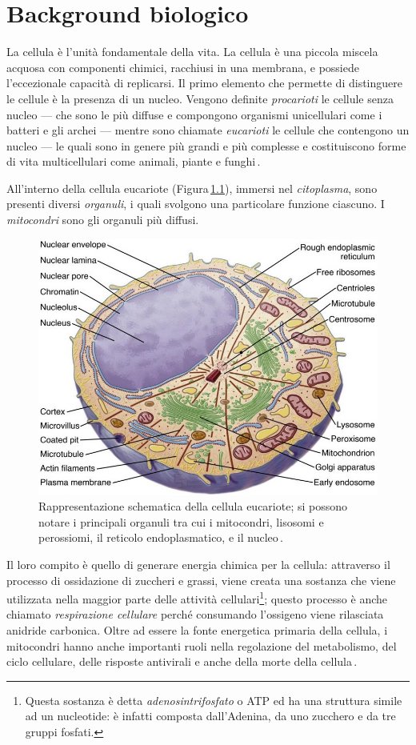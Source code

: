 
\chapter{Background biologico}\label{chp:biological-background}

La cellula è l'unità fondamentale della vita. La cellula è una piccola miscela acquosa con componenti chimici, racchiusi in una membrana, e possiede l'eccezionale capacità di replicarsi. Il primo elemento che permette di distinguere le cellule è la presenza di un nucleo. Vengono definite \textsl{procarioti} le cellule senza nucleo — che sono le più diffuse e compongono organismi unicellulari come i batteri e gli archei — mentre sono chiamate \textsl{eucarioti} le cellule che contengono un nucleo — le quali sono in genere più grandi e più complesse e costituiscono forme di vita multicellulari come animali, piante e funghi\,\cite{alberts2015essential}.

All'interno della cellula eucariote (Figura\,\ref{fig:cell}), immersi nel \textsl{citoplasma}, sono presenti diversi \textsl{organuli}, i quali svolgono una particolare funzione ciascuno. I \textsl{mitocondri} sono gli organuli più diffusi.
% 
\begin{figure}[b!]
    \centering
    \includegraphics[width=.65\textwidth]{assets/cell.jpg}
    \caption[Rappresentazione schematica della cellula eucariote.]{Rappresentazione schematica della cellula eucariote; si possono notare i principali organuli tra cui i mitocondri, lisosomi e perossiomi, il reticolo endoplasmatico, e il nucleo\,\cite{pollard2022cell}.}\label{fig:cell}
\end{figure}
% 
Il loro compito è quello di generare energia chimica per la cellula: attraverso il processo di ossidazione di zuccheri e grassi, viene creata una sostanza che viene utilizzata nella maggior parte delle attività cellulari\footnote{Questa sostanza è detta \textsl{adenosintrifosfato} o ATP ed ha una struttura simile ad un nucleotide: è infatti composta dall'Adenina, da uno zucchero e da tre gruppi fosfati.}; questo processo è anche chiamato \textsl{respirazione cellulare} perché consumando l'ossigeno viene rilasciata anidride carbonica. Oltre ad essere la fonte energetica primaria della cellula, i mitocondri hanno anche importanti ruoli nella regolazione del metabolismo, del ciclo cellulare, delle risposte antivirali e anche della morte della cellula\,\cite{alberts2015essential, chinnery2003mitochondria, mcbride2006mitochondria}.

